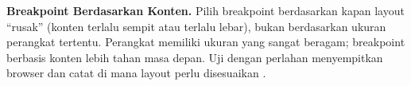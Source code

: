 \begin{catatan}
\textbf{Breakpoint Berdasarkan Konten.} Pilih breakpoint berdasarkan kapan layout ``rusak'' (konten terlalu sempit atau terlalu lebar), bukan berdasarkan ukuran perangkat tertentu. Perangkat memiliki ukuran yang sangat beragam; breakpoint berbasis konten lebih tahan masa depan. Uji dengan perlahan menyempitkan browser dan catat di mana layout perlu disesuaikan \cite{cssTricks}.
\end{catatan}

